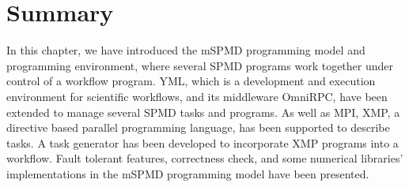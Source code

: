 \documentclass[graybox]{svmult}
\begin{document}
\section{Summary}

In this chapter, we have introduced the mSPMD programming model and programming environment, where several SPMD programs work together under control of a workflow program. YML, which is a development and execution environment for scientific workflows, and its middleware OmniRPC, have been extended to manage several SPMD tasks and programs. 
As well as MPI, XMP, a directive based parallel programming language, has been supported to describe tasks. 
A task generator has been developed to incorporate XMP programs into a workflow. 
Fault tolerant features, correctness check, and some numerical libraries' implementations in the mSPMD programming model have been presented. 


% 
%
\end{document}

